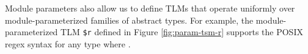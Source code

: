 

Module parameters also allow us to define TLMs that operate uniformly over module-parameterized families of abstract types. For example, the module-parameterized TLM \texttt{\$r} defined in Figure \ref{fig:param-tsm-r} supports the POSIX regex syntax for any type  where . 

